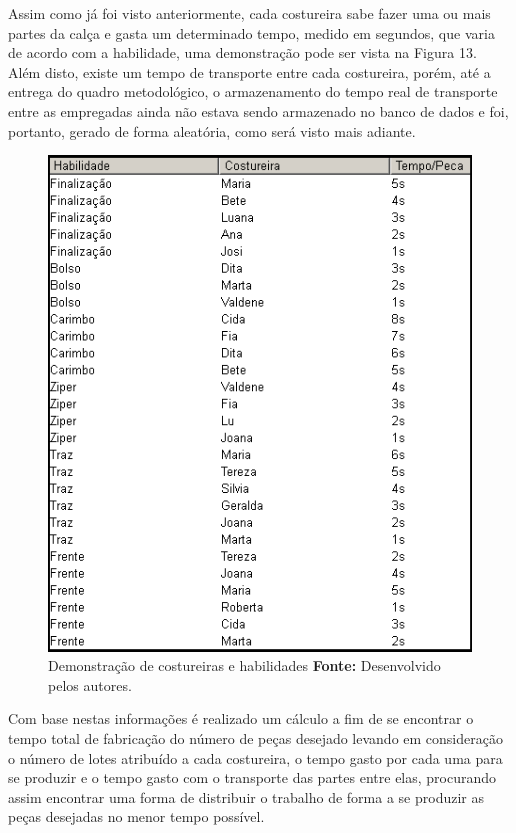 \par Assim como já foi visto anteriormente, cada costureira sabe fazer uma ou
mais partes da calça e gasta um determinado tempo, medido em segundos, que varia de acordo com a habilidade, uma demonstração pode ser vista na 
Figura 13. Além disto, existe um tempo de transporte entre cada costureira, porém, até a entrega do quadro 
metodológico, o armazenamento do tempo real de transporte entre as empregadas ainda não estava sendo armazenado no 
banco de dados e foi, portanto, gerado de forma aleatória, como será visto mais
adiante.

\newpage

\begin{figure}[h!]
	\centerline{\includegraphics[scale=0.4]{./imagens/tempo_habilidade2.png}}
	\caption[Costureiras e Habilidades]
	{Demonstração de costureiras e habilidades \textbf{Fonte:} Desenvolvido pelos
	autores.}
	\label{fig:exemplo1}
\end{figure}

\par Com base nestas informações é realizado um cálculo a fim de se encontrar o tempo total de fabricação do número de peças
desejado levando em consideração o número de lotes atribuído a cada costureira, o tempo gasto por cada uma para se produzir e 
o tempo gasto com o transporte das partes entre elas, procurando assim encontrar
uma forma de distribuir o trabalho de forma a se produzir as peças desejadas no menor tempo possível. 

